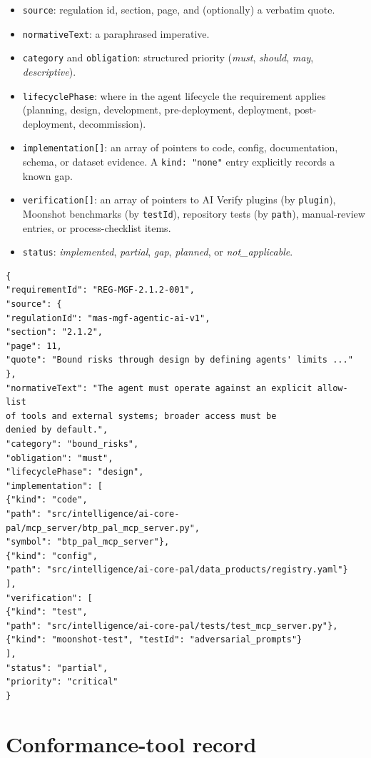 \documentclass[11pt,a4paper,twoside]{report}
\begin{document}
\begin{itemize}
\item \texttt{source}: regulation id, section, page, and (optionally) a
verbatim quote.
\item \texttt{normativeText}: a paraphrased imperative.
\item \texttt{category} and \texttt{obligation}: structured priority
(\emph{must}, \emph{should}, \emph{may}, \emph{descriptive}).
\item \texttt{lifecyclePhase}: where in the agent lifecycle the
requirement applies (planning, design, development,
pre-deployment, deployment, post-deployment, decommission).
\item \texttt{implementation[]}: an array of pointers to code, config,
documentation, schema, or dataset evidence. A \texttt{kind: "none"}
entry explicitly records a known gap.
\item \texttt{verification[]}: an array of pointers to AI Verify plugins
(by \texttt{plugin}), Moonshot benchmarks (by \texttt{testId}),
repository tests (by \texttt{path}), manual-review entries, or
process-checklist items.
\item \texttt{status}: \emph{implemented}, \emph{partial}, \emph{gap},
\emph{planned}, or \emph{not\_applicable}.
\end{itemize}

\begin{lstlisting}[language=jsonx,caption={Example requirement with
implementation and verification arrays (excerpt).},label={lst:req-example}]
{
"requirementId": "REG-MGF-2.1.2-001",
"source": {
"regulationId": "mas-mgf-agentic-ai-v1",
"section": "2.1.2",
"page": 11,
"quote": "Bound risks through design by defining agents' limits ..."
},
"normativeText": "The agent must operate against an explicit allow-list
of tools and external systems; broader access must be
denied by default.",
"category": "bound_risks",
"obligation": "must",
"lifecyclePhase": "design",
"implementation": [
{"kind": "code",
"path": "src/intelligence/ai-core-pal/mcp_server/btp_pal_mcp_server.py",
"symbol": "btp_pal_mcp_server"},
{"kind": "config",
"path": "src/intelligence/ai-core-pal/data_products/registry.yaml"}
],
"verification": [
{"kind": "test",
"path": "src/intelligence/ai-core-pal/tests/test_mcp_server.py"},
{"kind": "moonshot-test", "testId": "adversarial_prompts"}
],
"status": "partial",
"priority": "critical"
}
\end{lstlisting}

\section{Conformance-tool record}
\end{document}
